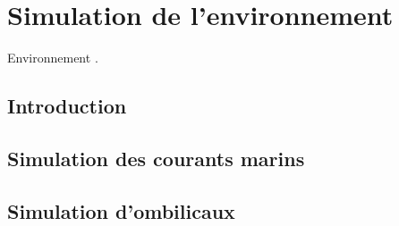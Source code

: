 \chapter{Simulation de l'environnement}
	
	Environnement \cite{bingham19toward}.

	\section{Introduction}

	\section{Simulation des courants marins}

	\section{Simulation d'ombilicaux}

		
	